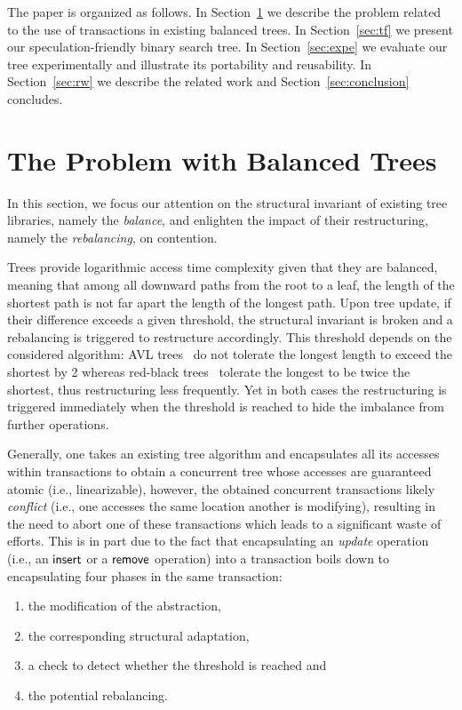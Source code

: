 The paper is organized as follows. In Section~\ref{sec:pb} we describe the problem related
to the use of transactions in existing balanced trees. In Section~\ref{sec:tf} we present our 
speculation-friendly binary search tree. In Section~\ref{sec:expe} we evaluate our tree
experimentally and illustrate its portability and reusability.
In Section~\ref{sec:rw} we describe the related work and 
Section~\ref{sec:conclusion} concludes.

\section{The Problem with Balanced Trees}\label{sec:pb}

In this section, we focus our attention 
on the structural invariant of existing tree libraries, namely 
the \emph{balance}, and enlighten the impact of their restructuring, namely the \emph{rebalancing}, on contention.

Trees provide logarithmic access time complexity given that they are balanced, 
meaning that among all downward paths from the root to a leaf, the length of the shortest path 
is not far apart the length of the longest path. Upon tree update, if their difference exceeds a given threshold, the structural invariant is broken and a rebalancing is triggered to restructure accordingly. 
%
This threshold depends on the considered algorithm: AVL trees~\cite{AVL62} do not tolerate 
the longest length to exceed the shortest by 2 whereas red-black trees~\cite{Bay72} tolerate 
the longest to be twice the shortest, thus restructuring less frequently.  Yet in both cases
the restructuring is triggered immediately when the threshold is reached to hide the imbalance from further operations.

Generally, one takes an existing tree algorithm and encapsulates all its accesses within transactions 
to obtain a concurrent 
tree whose accesses are guaranteed atomic (i.e., linearizable), however, 
the obtained concurrent transactions likely \emph{conflict} (i.e., one accesses the same 
location another is modifying), resulting in the need to abort one of these transactions which leads to  a significant waste of efforts.
This is in part due to the fact that encapsulating an \emph{update} operation (i.e., an $\act{insert}$ or a $\act{remove}$ operation)
into a transaction boils down to encapsulating four phases in the same transaction:
\begin{enumerate}
	\item the modification of the abstraction, 
	\item the corresponding structural adaptation,
	\item a check to detect whether the threshold is reached and 
	\item the potential rebalancing.
\end{enumerate}

